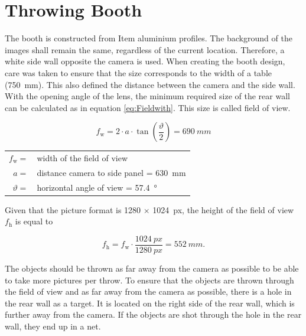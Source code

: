 \section{Throwing Booth}
\label{sec:booth}
The booth is constructed from Item aluminium profiles.
The background of the images shall remain the same, regardless of the current location.
Therefore, a white side wall opposite the camera is used.
When creating the booth design, care was taken to ensure that the size corresponds to the width of a table (\SI{750}{mm}).
This also defined the distance between the camera and the side wall.
With the opening angle of the lens, the minimum required size of the rear wall can be calculated as in equation \ref{eq:Fieldwith}. 
This size is called field of view.

\begin{equation}
	f_\text{w} = 2 \cdot a \cdot \tan\left( \frac{\vartheta}{2}\right) = \SI{690}{mm}
	\label{eq:Fieldwith}
\end{equation}

\begin{tabular}{rl}
	$f_\text{w} =$ & width of the field of view \\
	$a =$ & distance camera to side panel = \SI{630}{mm} \\
	$\vartheta =$ & horizontal angle of view = \SI{57.4}{\degree} \cite{baumer_lense} \\
\end{tabular}


Given that the picture format is 1280 $\times$ \SI{1024}{px}, the height of the field of view $f_\text{h}$ is equal to

\begin{equation}
	f_\text{h} = f_\text{w} \cdot \frac{\SI{1024}{px}}{\SI{1280}{px}} = \SI{552}{mm}.
	\label{eq:Fieldhight}
\end{equation}

The objects should be thrown as far away from the camera as possible to be able to take more pictures per throw.
To ensure that the objects are thrown through the field of view and as far away from the camera as possible, there is a hole in the rear wall as a target.
It is located on the right side of the rear wall, which is further away from the camera.
If the objects are shot through the hole in the rear wall, they end up in a net.

